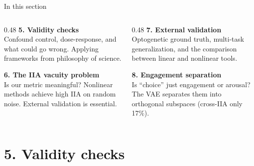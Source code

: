 \documentclass[aspectratio=169,11pt]{beamer}
\begin{document}
\begin{frame}{In this section}
\begin{columns}[T]
\begin{column}{0.48\textwidth}
\textbf{5. Validity checks}\\[0.2em]
{\small Confound control, dose-response, and what could go wrong. Applying frameworks from philosophy of science.}

\vspace{0.6em}
\textbf{6. The IIA vacuity problem}\\[0.2em]
{\small Is our metric meaningful? Nonlinear methods achieve high IIA on random noise. External validation is essential.}
\end{column}
\begin{column}{0.48\textwidth}
\textbf{7. External validation}\\[0.2em]
{\small Optogenetic ground truth, multi-task generalization, and the comparison between linear and nonlinear tools.}

\vspace{0.6em}
\textbf{8. Engagement separation}\\[0.2em]
{\small Is ``choice'' just engagement or arousal? The VAE separates them into orthogonal subspaces (cross-IIA only 17\%).}
\end{column}
\end{columns}
\end{frame}

\section{5. Validity checks}
\end{document}
